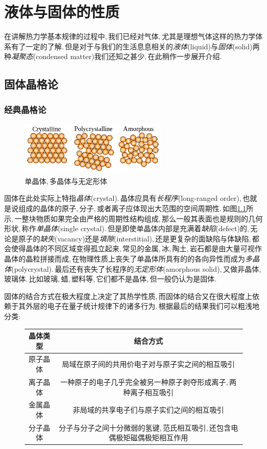 \chapter{液体与固体的性质}

在讲解热力学基本规律的过程中,\,我们已经对气体,\,尤其是理想气体这样的热力学体系有了一定的了解.\,但是对于与我们的生活息息相关的\emph{液体}(liquid)与\emph{固体}(solid)两种\emph{凝聚态}(condensed matter)我们还知之甚少.\,在此稍作一步展开介绍.

\section{固体晶格论}

\subsection{经典晶格论}

\begin{figure}
\centering
\includegraphics[width=7cm]{image/5-3-2.png}
\caption{单晶体,\,多晶体与无定形体}\label{fig:3crystal}
\end{figure}
固体在此处实际上特指\emph{晶体}(crystal).\,晶体应具有\emph{长程序}(long-ranged order),\,也就是说组成的晶体的原子,\,分子,\,或者离子应体现出大范围的空间周期性.\,如图\ref{fig:3crystal}所示,\,一整块物质如果完全由严格的周期性结构组成,\,那么一般其表面也是规则的几何形状,\,称作\emph{单晶体}(single crystal).\,但是即使单晶体内部是充满着\emph{缺陷}(defect)的,\,无论是原子的\emph{缺失}(vacancy)还是\emph{填隙}(interstitial),\,还是更复杂的面缺陷与体缺陷,\,都会使得晶体的不同区域变得孤立起来,\,常见的金属,\,冰,\,陶土,\,岩石都是由大量可视作晶体的晶粒拼接而成,\,在物理性质上丧失了单晶体所具有的的各向异性而成为\emph{多晶体}(polycrystal).\,最后还有丧失了长程序的\emph{无定形体}(amorphous solid),\,又做非晶体,\,玻璃体.\,比如玻璃,\,蜡,\,塑料等,\,它们都不是晶体,\,但一般仍认为是固体.

固体的结合方式在极大程度上决定了其热学性质,\,而固体的结合又在很大程度上依赖于其外层的电子在量子统计规律下的诸多行为.\,根据最后的结果我们可以粗浅地分类:
\begin{figure}[H]
\centering
\begin{tabular}{c|c}
\hline
晶体类型			&		结合方式\\ \hline\hline
原子晶体			& 局域在原子间的共用价电子对与原子实之间的相互吸引 \\ \hline
离子晶体 		& 一种原子的电子几乎完全被另一种原子剥夺形成离子,\,两种离子相互吸引 \\ \hline
金属晶体			& 非局域的共享电子们与原子实们之间的相互吸引 \\ \hline
分子晶体 		& 分子与分子之间十分微弱的氢键,\,范氏相互吸引,\,还包含电偶极矩磁偶极矩相互作用 \\ \hline
\end{tabular}
\end{figure}


